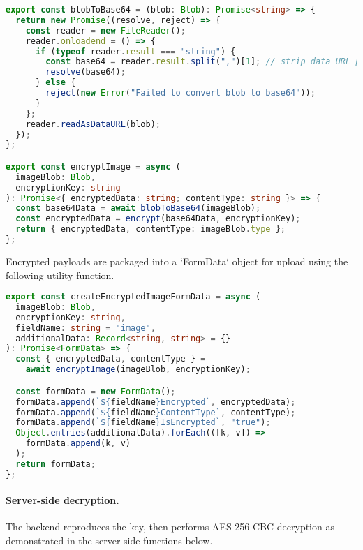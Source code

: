 \begin{lstlisting}[language=TypeScript, caption={Client-side webcam image processing and encryption}, label={lst:image-processing}]
export const blobToBase64 = (blob: Blob): Promise<string> => {
  return new Promise((resolve, reject) => {
    const reader = new FileReader();
    reader.onloadend = () => {
      if (typeof reader.result === "string") {
        const base64 = reader.result.split(",")[1]; // strip data URL prefix
        resolve(base64);
      } else {
        reject(new Error("Failed to convert blob to base64"));
      }
    };
    reader.readAsDataURL(blob);
  });
};

export const encryptImage = async (
  imageBlob: Blob,
  encryptionKey: string
): Promise<{ encryptedData: string; contentType: string }> => {
  const base64Data = await blobToBase64(imageBlob);
  const encryptedData = encrypt(base64Data, encryptionKey);
  return { encryptedData, contentType: imageBlob.type };
};
\end{lstlisting}

Encrypted payloads are packaged into a `FormData` object for upload using the following utility function.

\begin{lstlisting}[language=TypeScript, caption={Creation of FormData for encrypted image upload}, label={lst:form-data}]
export const createEncryptedImageFormData = async (
  imageBlob: Blob,
  encryptionKey: string,
  fieldName: string = "image",
  additionalData: Record<string, string> = {}
): Promise<FormData> => {
  const { encryptedData, contentType } =
    await encryptImage(imageBlob, encryptionKey);

  const formData = new FormData();
  formData.append(`${fieldName}Encrypted`, encryptedData);
  formData.append(`${fieldName}ContentType`, contentType);
  formData.append(`${fieldName}IsEncrypted`, "true");
  Object.entries(additionalData).forEach(([k, v]) =>
    formData.append(k, v)
  );
  return formData;
};
\end{lstlisting}

\paragraph{Server-side decryption.}
The backend reproduces the key, then performs AES-256-CBC decryption as demonstrated in the server-side functions below.

